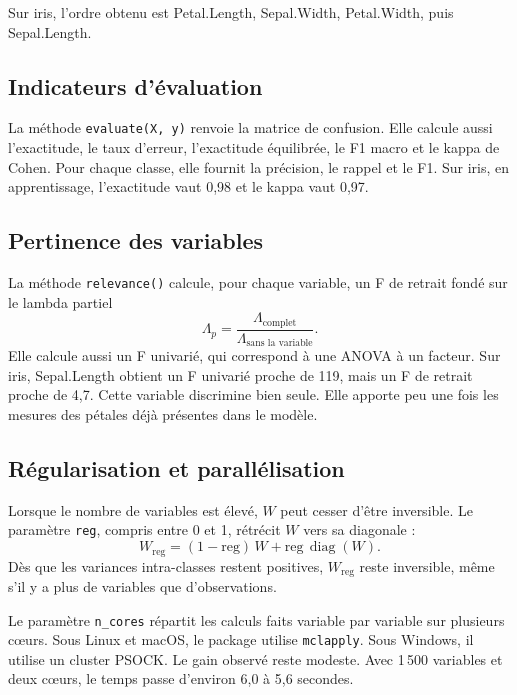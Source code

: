 \documentclass[11pt,a4paper]{article}
\begin{document}
Sur iris, l'ordre obtenu est Petal.Length, Sepal.Width, Petal.Width, puis
Sepal.Length.

\subsection{Indicateurs d'\'evaluation}

La m\'ethode \texttt{evaluate(X, y)} renvoie la matrice de confusion. Elle
calcule aussi l'exactitude, le taux d'erreur, l'exactitude \'equilibr\'ee, le
F1 macro et le kappa de Cohen. Pour chaque classe, elle fournit la
pr\'ecision, le rappel et le F1. Sur iris, en apprentissage, l'exactitude vaut
0{,}98 et le kappa vaut 0{,}97.

\subsection{Pertinence des variables}

La m\'ethode \texttt{relevance()} calcule, pour chaque variable, un F de
retrait fond\'e sur le lambda partiel
\begin{equation}
  \Lambda_p = \frac{\Lambda_{\text{complet}}}{\Lambda_{\text{sans la variable}}}.
\end{equation}
Elle calcule aussi un F univari\'e, qui correspond \`a une ANOVA \`a un facteur.
Sur iris, Sepal.Length obtient un F univari\'e proche de 119, mais un F de
retrait proche de 4{,}7. Cette variable discrimine bien seule. Elle apporte
peu une fois les mesures des p\'etales d\'ej\`a pr\'esentes dans le mod\`ele.

\subsection{R\'egularisation et parall\'elisation}

Lorsque le nombre de variables est \'elev\'e, \(W\) peut cesser d'\^etre
inversible. Le param\`etre \texttt{reg}, compris entre 0 et 1, r\'etr\'ecit
\(W\) vers sa diagonale :
\begin{equation}
  W_{\text{reg}} = (1 - \text{reg})\, W + \text{reg}\, \operatorname{diag}(W).
\end{equation}
D\`es que les variances intra-classes restent positives, \(W_{\text{reg}}\)
reste inversible, m\^eme s'il y a plus de variables que d'observations.

Le param\`etre \texttt{n\_cores} r\'epartit les calculs faits variable par
variable sur plusieurs c\oe urs. Sous Linux et macOS, le package utilise
\texttt{mclapply}. Sous Windows, il utilise un cluster PSOCK. Le gain observ\'e
reste modeste. Avec 1\,500 variables et deux c\oe urs, le temps passe d'environ
6{,}0 \`a 5{,}6 secondes.
\end{document}
